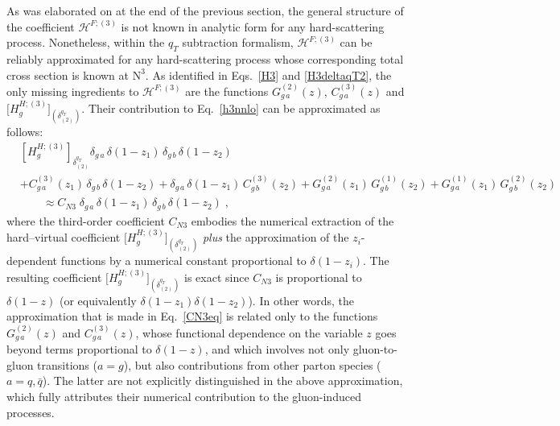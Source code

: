 \documentclass[12pt]{article}
\DeclareRobustCommand{\nn}{\nonumber}
\DeclareRobustCommand{\qt}{\ensuremath{q_T}\xspace}
\DeclareRobustCommand{\cH}{\ensuremath{\mathcal{H}}}
\DeclareRobustCommand{\LO}{\text{LO}\xspace}
\DeclareRobustCommand{\N}[1]{\ensuremath{\text{N}^{#1}}} %
\begin{document}
As was elaborated on at the end of the previous section, the general structure of the coefficient $\cH^{F;(3)}$ is not known in analytic form for any hard-scattering process. Nonetheless, within the $\qt$ subtraction  formalism, $\cH^{F;(3)}$ can be reliably approximated for any hard-scattering process whose corresponding total cross section is known at \N3\LO. 
As identified in Eqs.~\eqref{H3} and \eqref{H3deltaqT2}, the only missing ingredients to $\cH^{F;(3)}$ are the functions $G^{(2)}_{g\,a}(z)$, $C^{(3)}_{g\,a}(z)$ and $ \bigl[H^{H;(3)}_{g}\bigr]_{(\delta^{\qt}_{(2)})}$. 
Their contribution to Eq.~\eqref{h3nnlo} can be approximated as follows:
\begin{align}
  &
  \left[ H_g^{H;(3)} \right]_{\delta^{\qt}_{(2)}} 
  \delta_{g\,a} \, \delta(1-z_1) \, \delta_{g\,b} \, \delta(1-z_2) 
  \nn\\&
  + C^{(3)}_{g\,a}(z_1) \, \delta_{g\,b} \, \delta(1-z_2) 
  + \delta_{g\,a} \, \delta(1-z_1) \, C^{(3)}_{g\,b}(z_2) 
  + G^{(2)}_{g\,a}(z_1) \, G^{(1)}_{g\,b}(z_2) 
  + G^{(1)}_{g\,a}(z_1) \, G^{(2)}_{g\,b}(z_2) 
  \nn\\&\qquad\approx
  C_{N3} \; \delta_{g\,a} \, \delta(1-z_1) \, \delta_{g\,b} \, \delta(1-z_2) \;,
  \label{CN3eq}
\end{align}
where the third-order coefficient $C_{N3}$ embodies the numerical extraction of the hard--virtual coefficient $\big[H^{H;(3)}_{g}\big]_{(\delta^{\qt}_{(2)})}$  \textit{plus} the approximation of the $z_i$-dependent functions by a numerical constant proportional to $\delta(1-z_i)$. The resulting coefficient $\big[H^{H;(3)}_{g}\big]_{(\delta^{\qt}_{(2)})}$ is exact since $C_{N3}$ is proportional to $\delta(1-z)$ (or equivalently $\delta(1-z_1)\delta(1-z_2)$). In other words, the approximation that is made in Eq.~\eqref{CN3eq} is related only to the functions  $G^{(2)}_{g\,a}(z)$ and $C^{(3)}_{g\,a}(z)
$, whose functional dependence on the variable $z$ goes beyond terms proportional to $\delta(1-z)$, and which involves not only gluon-to-gluon transitions ($a=g$), but also contributions from 
other parton species ($a=q,\bar q$). The latter are not explicitly distinguished in the above approximation, which fully attributes their numerical contribution to the gluon-induced processes. 
\end{document}
